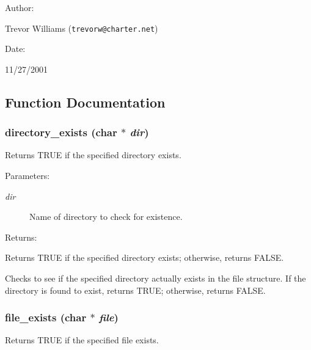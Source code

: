 \begin{Desc}
\item[Author: ]\par
Trevor Williams ({\tt trevorw@charter.net}) \end{Desc}
\begin{Desc}
\item[Date: ]\par
11/27/2001\end{Desc}


\subsection{Function Documentation}
\subsubsection{ directory\_\-exists (char $\ast$ {\em dir})}\label{util_8c_a7}


Returns TRUE if the specified directory exists.

\begin{Desc}
\item[Parameters: ]\par
\begin{description}
\item[{\em 
dir}]Name of directory to check for existence. \end{description}
\end{Desc}
\begin{Desc}
\item[Returns: ]\par
Returns TRUE if the specified directory exists; otherwise, returns FALSE.\end{Desc}
Checks to see if the specified directory actually exists in the file structure. If the directory is found to exist, returns TRUE; otherwise, returns FALSE. 
\subsubsection{ file\_\-exists (char $\ast$ {\em file})}\label{util_8c_a8}


Returns TRUE if the specified file exists.

